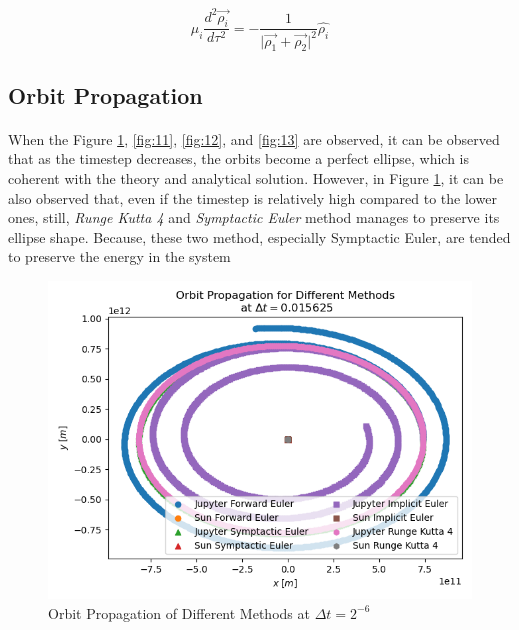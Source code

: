 \documentclass[letterpaper,12pt]{article}
\begin{document}
\begin{equation*}
    \mu_i \frac{d^2 \vec{\rho_i}}{d\tau^2} = - \frac{1}{\lvert \vec{\rho_1} + \vec{\rho_2} \rvert^2} \hat{\rho_i}
\end{equation*}


\subsection{Orbit Propagation}
\paragraph{} When the Figure \ref{fig:10}, \ref{fig:11}, \ref{fig:12}, and \ref{fig:13} are observed, it can be observed that as the timestep decreases, the orbits become a perfect ellipse, which is coherent with the theory and analytical solution. However, in Figure \ref{fig:10}, it can be also observed that, even if the timestep is relatively high compared to the lower ones, still, \textit{Runge Kutta 4} and \textit{Symptactic Euler} method manages to preserve its ellipse shape. Because, these two method, especially Symptactic Euler, are tended to preserve the energy in the system 
\begin{figure}[H]
    \centerline{\includegraphics[width=0.7\linewidth]{figures/10.png}}
    \caption{Orbit Propagation of Different Methods at $\Delta t = 2^{-6}$}
    \label{fig:10}
    \end{figure}
    
\end{document}
